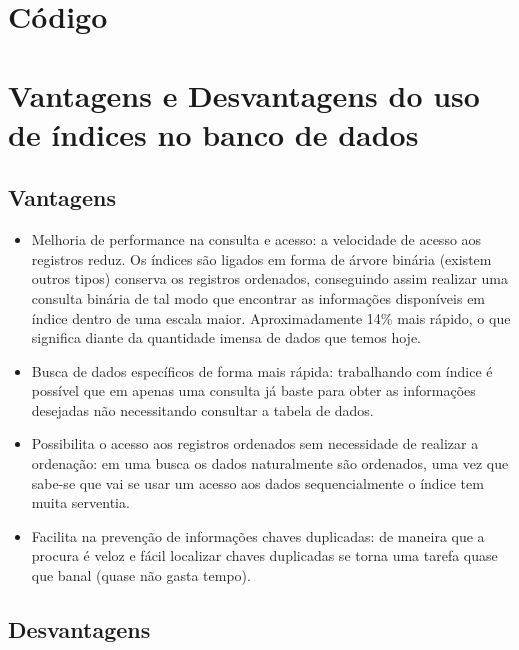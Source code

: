 \documentclass[12pt,a4paper]{article}
\begin{document}
\section{Código}





\section{Vantagens e Desvantagens do uso de índices no banco de dados}

\subsection{Vantagens}

\begin{itemize}
	\item Melhoria de performance na consulta e acesso: a velocidade de acesso aos registros reduz. Os índices são ligados em forma de árvore binária (existem outros tipos) conserva os registros ordenados, conseguindo assim realizar uma consulta binária de tal modo que encontrar as informações disponíveis em índice dentro de uma escala maior. Aproximadamente 14\% mais rápido, o que significa diante da quantidade imensa de dados que temos hoje.
	
	\item Busca de dados específicos de forma mais rápida: trabalhando com índice é possível que em apenas uma consulta já baste para obter as informações desejadas não necessitando consultar a tabela de dados.
	
	\item Possibilita o acesso aos registros ordenados sem necessidade de realizar a ordenação: em uma busca os dados naturalmente são ordenados, uma vez que sabe-se que vai se usar um acesso aos dados sequencialmente o índice tem muita serventia.
	
	\item Facilita na prevenção de informações chaves duplicadas: de maneira que a procura é veloz e fácil localizar chaves duplicadas se torna uma tarefa quase que banal (quase não gasta tempo).	
	
\end{itemize}

\subsection{Desvantagens}
\end{document}
